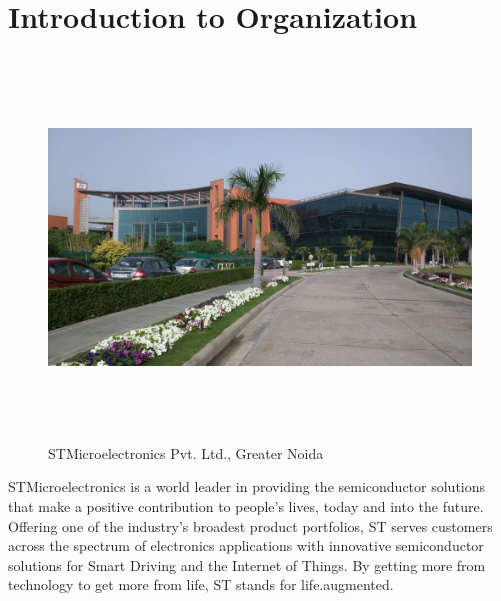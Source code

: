 \chapter{Introduction to Organization}
\begin{figure}[ht]
	\centering
	\includegraphics[width=4.5in, height=4in]{images/campus.jpg}
	\caption{STMicroelectronics Pvt. Ltd., Greater Noida}
\end{figure}
\noindent STMicroelectronics is a world leader in providing the semiconductor solutions that make a positive contribution to people's lives, today and into the future.\\
\noindent Offering one of the industry's broadest product portfolios, ST serves customers across the spectrum of electronics applications with innovative semiconductor solutions for Smart Driving and the Internet of Things. By getting more from technology to get more from life, ST stands for life.augmented.
